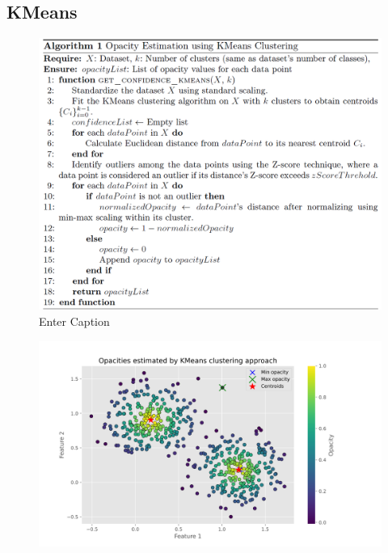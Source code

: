 \documentclass[aspectratio=169]{beamer}
\begin{document}
\subsection{{\rm KMeans}}
\begin{frame}
\begin{figure}
    \centering
    \includegraphics[width=0.68\linewidth]{../../fig/alg_kmeans_opacity.png}
    \caption{Enter Caption}
    \label{fig:enter-label}
\end{figure}
\end{frame}

\begin{frame}
\begin{figure}
    \centering
    \includegraphics[width=0.78\linewidth]{../../fig/kmeans_opactiy.png}
    \label{fig:enter-label}
\end{figure}
\end{frame}
\end{document}
